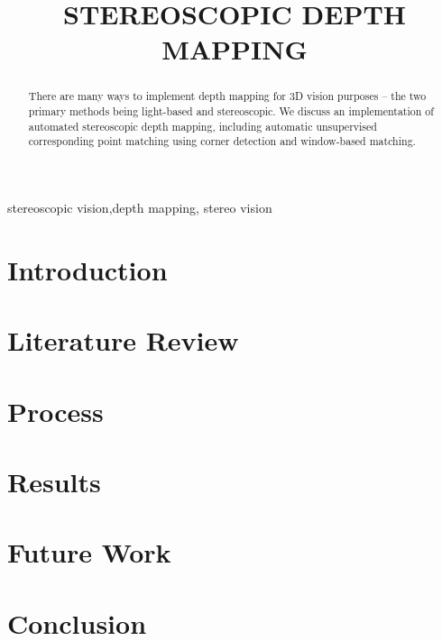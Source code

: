 \documentclass{article}
\begin{document}
\sloppy

\def\x{{\mathbf x}}
\def\L{{\cal L}}


\title{STEREOSCOPIC DEPTH MAPPING}
%
\address{Rose-Hulman Institute of Technology\\
Terre Haute, Indiana}


\maketitle
\thispagestyle{fancy} \fancyhead{} \lhead{}
\renewcommand{\headrulewidth}{0pt}
\renewcommand{\footrulewidth}{0pt}




%
\begin{abstract}
There are many ways to implement depth mapping for 3D vision purposes -- the two primary methods being light-based and stereoscopic. We discuss an implementation of automated stereoscopic depth mapping, including automatic unsupervised corresponding point matching using corner detection and window-based matching. 
\end{abstract}
%
\begin{keywords}
stereoscopic vision,depth mapping, stereo vision
\end{keywords}
%
\section{Introduction}
\label{sec:intro}


\section{Literature Review}
\label{sec:litreview}


\section{Process}
\label{sec:Process}


\section{Results}
\label{sec:Results}


\section{Future Work}
\label{sec:future}


\section{Conclusion}
\label{sec:conclusion}

\end{document}
